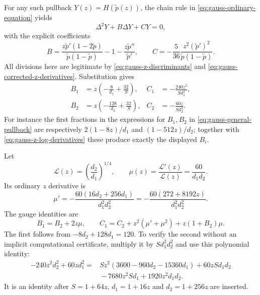 \documentclass[11pt,a4paper]{article}
\begin{document}
For any such pullback $Y(z)=H(\widetilde p(z))$, the chain rule in
\eqref{eq:gauss-ordinary-equation} yields
\[
 \Delta^2Y+B\Delta Y+CY=0,
\]
with the explicit coefficients
\begin{equation}\label{eq:gauss-general-pullback}
 B=\frac{z\widetilde p'(1-2\widetilde p)}
               {\widetilde p(1-\widetilde p)}
               -1-\frac{z\widetilde p''}{\widetilde p'},
 \qquad
 C=-\frac5{36}\frac{z^2(\widetilde p')^2}
                         {\widetilde p(1-\widetilde p)}.
\end{equation}
All divisions here are legitimate by
\eqref{eq:gauss-z-discriminants} and
\eqref{eq:gauss-corrected-z-derivatives}.  Substitution gives
\begin{equation}\label{eq:gauss-corrected-z-coefficients}
\begin{aligned}
 B_1&=z\left(-\frac8{d_1}+\frac{32}{S}\right),&
 C_1&=-\frac{240z^2}{Sd_1^2},\\
 B_2&=z\left(-\frac{128}{d_2}+\frac{32}{S}\right),&
 C_2&=-\frac{60z}{Sd_2^2}.
\end{aligned}
\end{equation}
For instance the first fractions in the expressions for $B_1,B_2$
in \eqref{eq:gauss-general-pullback} are respectively
$2(1-8z)/d_1$ and $(1-512z)/d_2$; together with
\eqref{eq:gauss-z-log-derivatives} these produce exactly the displayed
$B_i$.

Let
\[
 \mathcal L(z)=\left(\frac{d_2}{d_1}\right)^{1/4},
 \qquad \mu(z)=\frac{\mathcal L'(z)}{\mathcal L(z)}
                  =\frac{60}{d_1d_2}.
\]
Its ordinary $z$ derivative is
\[
 \mu'=-\frac{60(16d_2+256d_1)}{d_1^2d_2^2}
      =-\frac{60(272+8192z)}{d_1^2d_2^2}.
\]
The gauge identities are
\begin{equation}\label{eq:gauss-z-gauge-identities}
 B_1=B_2+2z\mu,
 \qquad
 C_1=C_2+z^2(\mu'+\mu^2)+z(1+B_2)\mu.
\end{equation}
The first follows from $-8d_2+128d_1=120$.  To verify the second
without an implicit computational certificate, multiply it by
$Sd_1^2d_2^2$ and use this polynomial identity:
\begin{equation}\label{eq:gauss-z-gauge-polynomial}
\begin{aligned}
 -240z^2d_2^2+60zd_1^2
  ={}&Sz^2(3600-960d_2-15360d_1)
       +60zSd_1d_2\\
     &{}-7680z^2Sd_1+1920z^2d_1d_2.
\end{aligned}
\end{equation}
It is an identity after $S=1+64z$, $d_1=1+16z$ and $d_2=1+256z$
are inserted.
\end{document}
